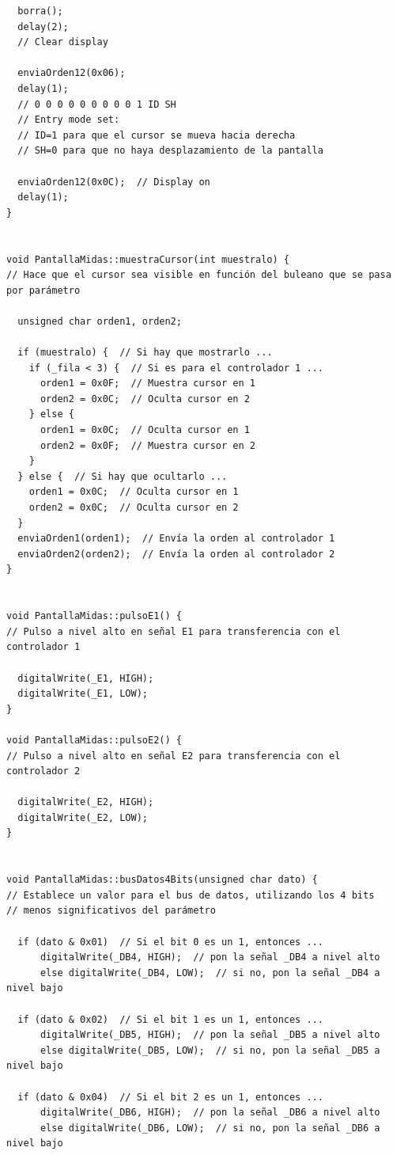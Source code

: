 \documentclass[11pt,twoside]{book}
\begin{document}
\begin{lstlisting}
  borra();
  delay(2);
  // Clear display
  
  enviaOrden12(0x06);
  delay(1);
  // 0 0 0 0 0 0 0 0 0 1 ID SH
  // Entry mode set: 
  // ID=1 para que el cursor se mueva hacia derecha
  // SH=0 para que no haya desplazamiento de la pantalla
  
  enviaOrden12(0x0C);  // Display on
  delay(1);
}


void PantallaMidas::muestraCursor(int muestralo) {
// Hace que el cursor sea visible en función del buleano que se pasa por parámetro

  unsigned char orden1, orden2;
  
  if (muestralo) {  // Si hay que mostrarlo ...
    if (_fila < 3) {  // Si es para el controlador 1 ...
      orden1 = 0x0F;  // Muestra cursor en 1
      orden2 = 0x0C;  // Oculta cursor en 2
    } else {
      orden1 = 0x0C;  // Oculta cursor en 1
      orden2 = 0x0F;  // Muestra cursor en 2
    }
  } else {  // Si hay que ocultarlo ...
    orden1 = 0x0C;  // Oculta cursor en 1
    orden2 = 0x0C;  // Oculta cursor en 2
  }
  enviaOrden1(orden1);  // Envía la orden al controlador 1
  enviaOrden2(orden2);  // Envía la orden al controlador 2
}


void PantallaMidas::pulsoE1() {
// Pulso a nivel alto en señal E1 para transferencia con el controlador 1

  digitalWrite(_E1, HIGH);
  digitalWrite(_E1, LOW);
}

void PantallaMidas::pulsoE2() {
// Pulso a nivel alto en señal E2 para transferencia con el controlador 2

  digitalWrite(_E2, HIGH);
  digitalWrite(_E2, LOW);
}


void PantallaMidas::busDatos4Bits(unsigned char dato) {
// Establece un valor para el bus de datos, utilizando los 4 bits
// menos significativos del parámetro

  if (dato & 0x01)  // Si el bit 0 es un 1, entonces ...
      digitalWrite(_DB4, HIGH);  // pon la señal _DB4 a nivel alto
      else digitalWrite(_DB4, LOW);  // si no, pon la señal _DB4 a nivel bajo
      
  if (dato & 0x02)  // Si el bit 1 es un 1, entonces ...
      digitalWrite(_DB5, HIGH);  // pon la señal _DB5 a nivel alto
      else digitalWrite(_DB5, LOW);  // si no, pon la señal _DB5 a nivel bajo
      
  if (dato & 0x04)  // Si el bit 2 es un 1, entonces ...
      digitalWrite(_DB6, HIGH);  // pon la señal _DB6 a nivel alto
      else digitalWrite(_DB6, LOW);  // si no, pon la señal _DB6 a nivel bajo
      

\end{lstlisting}
\end{document}
